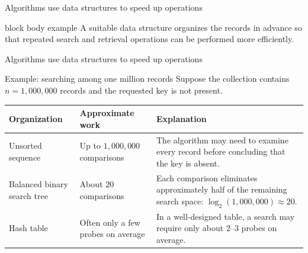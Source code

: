 \documentclass[aspectratio=169]{beamer}
\begin{document}
\begin{frame}{Algorithms use data structures to speed up operations}
  \small

  \begin{beamercolorbox}[
      wd=\textwidth,
      sep=0.7em,
      center,
      rounded=true
    ]{block body example}
    A suitable data structure organizes the records in advance so that repeated search and retrieval operations can be performed more efficiently.
  \end{beamercolorbox}
\end{frame}

\begin{frame}{Algorithms use data structures to speed up operations}
  \small

  \begin{block}{Example: searching among one million records}
    Suppose the collection contains $n = 1{,}000{,}000$ records and the requested key is not present.
  \end{block}

  \begin{center}
    \begin{tabular}{p{}p{}p{}}
      \toprule
      \textbf{Organization} & \textbf{Approximate work} & \textbf{Explanation} \\
      \midrule
      Unsorted sequence & Up to $1{,}000{,}000$ comparisons & The algorithm may need to examine every record before concluding that the key is absent. \\
      Balanced binary search tree & About $20$ comparisons & Each comparison eliminates approximately half of the remaining search space: $\log_2(1{,}000{,}000) \approx 20$. \\
      \addlinespace
      Hash table & Often only a few probes on average & In a well-designed table, a search may require only about $2$--$3$ probes on average. \\
      \bottomrule
    \end{tabular}
  \end{center}
\end{frame}
\end{document}

